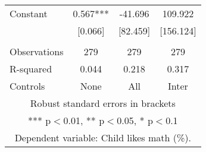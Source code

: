 \begin{tabular}{lccc}
Constant & 0.567*** & -41.696 & 109.922 \\
 & [0.066] & [82.459] & [156.124] \\
 &  &  &  \\
Observations & 279 & 279 & 279 \\
R-squared & 0.044 & 0.218 & 0.317 \\
 Controls & None & All & Inter \\ \hline
\multicolumn{4}{c}{ Robust standard errors in brackets} \\
\multicolumn{4}{c}{ *** p$<$0.01, ** p$<$0.05, * p$<$0.1} \\
\multicolumn{4}{c}{ Dependent variable: Child likes math (\%).} \\
\end{tabular}
